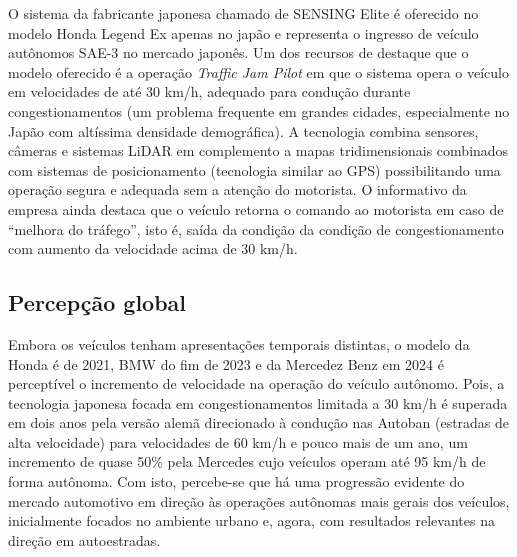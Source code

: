 O sistema da fabricante japonesa \parencite{honda2021sensingelite} chamado de SENSING Elite é oferecido no modelo Honda Legend Ex apenas no japão e representa o ingresso de veículo autônomos SAE-3 no mercado japonês. Um dos recursos de destaque que o modelo oferecido é a operação \textit{Traffic Jam Pilot} em que o sistema opera o veículo em velocidades de até 30 km/h, adequado para condução durante congestionamentos (um problema frequente em grandes cidades, especialmente no Japão com altíssima densidade demográfica). A tecnologia combina sensores, câmeras e sistemas LiDAR em complemento a mapas tridimensionais combinados com sistemas de posicionamento (tecnologia similar ao GPS) possibilitando uma operação segura e adequada sem a atenção do motorista. O informativo da empresa ainda destaca que o veículo retorna o comando ao motorista em caso de ``melhora do tráfego'', isto é, saída da condição da condição de congestionamento com aumento da velocidade acima de 30 km/h.

\subsection{Percepção global}

Embora os veículos tenham apresentações temporais distintas, o modelo da Honda é de 2021, BMW do fim de 2023 e da Mercedez Benz em 2024 é perceptível o incremento de velocidade na operação do veículo autônomo. Pois, a tecnologia japonesa focada em congestionamentos limitada a 30 km/h é superada em dois anos pela versão alemã direcionado à condução nas Autoban (estradas de alta velocidade) para velocidades de 60 km/h e pouco mais de um ano, um incremento de quase 50\% pela Mercedes cujo veículos operam até 95 km/h de forma autônoma. Com isto, percebe-se que há uma progressão evidente do mercado automotivo em direção às operações autônomas mais gerais dos veículos, inicialmente focados no ambiente urbano e, agora, com resultados relevantes na direção em autoestradas.